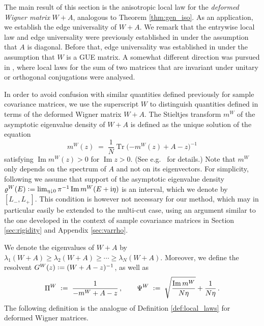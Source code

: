 \documentclass[11pt]{article} %
\numberwithin{equation}{section}
\numberwithin{figure}{section}
\theoremstyle{plain} %
\theoremstyle{definition} %
\newcommand{\ii}{\mathrm{i}}
\newcommand*{\deq}{\mathrel{\vcenter{\baselineskip0.65ex \lineskiplimit0pt \hbox{.}\hbox{.}}}=}
\renewcommand{\geq}{\geqslant}
\newcommand{\pb}[1]{\bigl({#1}\bigr)}
\DeclareMathOperator{\tr}{Tr}
\DeclareMathOperator{\im}{Im}
\begin{document}
The main result of this section is the anisotropic local law for the \emph{deformed Wigner matrix} $W + A$, analogous to Theorem \ref{thm:gen_iso}. As an application, we establish the edge universality of $W + A$. We remark that the entrywise local law and edge universality were previously established in \cite{LSY} under the assumption that $A$ is diagonal. Before that, edge universality was established in \cite{CP1,Joh2,Shc} under the assumption that $W$ is a GUE matrix. A somewhat different direction was pursued in \cite{BES15,BG15,Kar15}, where local laws for the sum of two matrices that are invariant under unitary or orthogonal conjugations were analysed.


In order to avoid confusion with similar quantities defined previously for sample covariance matrices, we use the superscript $W$ to distinguish quantities defined in terms of the deformed Wigner matrix $W+A$.
The Stieltjes transform $m^W$ of the asymptotic eigenvalue density of $W + A$ is defined as the unique solution of the equation
\begin{equation*}
m^W(z) \;=\; \frac { 1}N\tr\pb{-m^W(z) + A-z}^{-1}
\end{equation*}
satisfying $\im m^W(z) > 0$ for $\im z > 0$. (See e.g.\ \cite{Past} for details.) Note that $m^W$ only depends on the spectrum of $A$ and not on its eigenvectors.
For simplicity, following \cite{LSY} we assume that support of the asymptotic eigenvalue density $\varrho^W(E) \deq \lim_{\eta \downarrow 0} \pi^{-1} \im m^W(E + \ii \eta)$ is an interval, which we denote by $[L_-, L_+]$. This condition is however not necessary for our method, which may in particular easily be extended to the multi-cut case, using an argument similar to the one developed in the context of sample covariance matrices in Section \ref{sec:rigidity} and Appendix \ref{sec:varrho}.


We denote the eigenvalues of $W+A$ by $\lambda_1(W+A) \geq \lambda_2(W+A) \geq \cdots \geq \lambda_N(W+A)$.
Moreover, we define the resolvent $G^W(z) \deq (W+A - z)^{-1}$, as well as
\begin{equation*}
\Pi^W \;\deq\; \frac{1}{-m^W+A-z} \,, \qquad \Psi^W \;\deq\; \sqrt{\frac{\im m^W}{N\eta}}+\frac1{N\eta}\,.
\end{equation*}
The following definition is the analogue of Definition \ref{def:local_laws} for deformed Wigner matrices.
\end{document}
